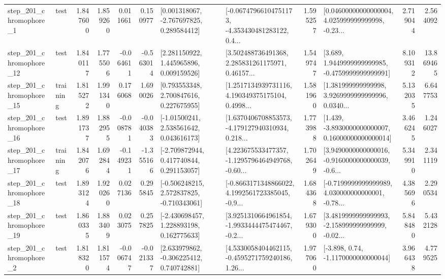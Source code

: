 \begin{tabular}{llrrrrllrlrr}
   step\_201\_chromophore\_1 &      test &      1.847600 &    1.859260 &      0.011661 &  0.150977 &    [0.001318067, -2.767697825, 0.289584412] &  [-0.06747966104751173, -4.353430481283122, 0.4... &       1.595257 &  [0.04600000000000004, 4.025999999999998, -0.23... &            2.719044 &          2.564092 \\
  step\_201\_chromophore\_12 &      test &      1.840117 &    1.775506 &     -0.064611 & -0.563014 &     [2.281150922, 1.445965896, 0.009159526] &  [3.502488736491368, 2.285831261175971, 0.46157... &       1.549747 &   [3.689, 1.9449999999999985, -0.4759999999999991] &            8.109312 &         13.869465 \\
  step\_201\_chromophore\_15 &  training &      1.815272 &    1.991340 &      0.176068 &  1.690026 &     [0.793553348, 2.700847616, 0.227675955] &  [1.2517134939731116, 4.190349375175104, 0.4998... &       1.581960 &  [1.381999999999998, 3.9269999999999996, 0.0340... &            5.132035 &          6.647753 \\
  step\_201\_chromophore\_16 &      test &      1.891737 &    1.882955 &     -0.008781 & -0.040383 &     [-1.01500241, 2.538561642, 0.043616173] &  [1.6370406708853573, -4.179127940310934, 0.218... &       1.773988 &  [1.439, -3.8930000000000007, 0.16000000000000014] &            3.466245 &          1.246027 \\
  step\_201\_chromophore\_17 &  training &      1.842076 &    1.692844 &     -0.149231 & -1.355166 &    [-2.709872944, 0.417740844, 0.291153057] &  [4.223675533477357, -1.1295796464949768, -0.60... &       1.702649 &  [3.9490000000000016, -0.9160000000000039, -0.6... &            5.349910 &          2.341119 \\
  step\_201\_chromophore\_18 &      test &      1.893124 &    1.920260 &      0.027136 &  0.295845 &   [-0.506248215, 2.572837825, -0.710343061] &  [-0.8663171348866022, 4.1992561723385045, -0.9... &       1.684368 &  [-0.7199999999999989, 4.030000000000001, -0.78... &            4.385696 &          2.290534 \\
  step\_201\_chromophore\_19 &      test &      1.860335 &    1.883409 &      0.023075 &  0.257825 &    [-2.430698457, 1.228893198, 0.162775633] &  [3.9251310664961854, -1.9933444475474467, -0.2... &       1.679300 &  [3.4819999999999993, -2.158999999999999, -0.02... &            5.848480 &          5.432128 \\
   step\_201\_chromophore\_2 &      test &      1.818320 &    1.811574 &     -0.006747 & -0.021337 &    [2.633979862, -0.306225412, 0.740742881] &  [4.5330058404462115, -0.4595271759240186, 1.26... &       1.977060 &                [-3.898, 0.74, -1.1170000000000044] &            3.966438 &          4.779525 \\

\end{tabular}
